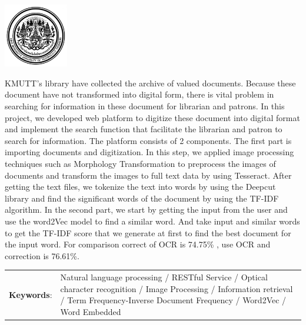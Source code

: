 \documentclass[12pt,oneside,openright,a4paper]{cpe-thai-project}
\begin{document}
\pdfstringdefDisableCommands{%
\let\MakeUppercase\relax
}
\begin{center}
\includegraphics[width=2.8cm]{logo02.jpg}
\end{center}
\vspace*{-1cm}
\maketitlepage
\makesignaturepage 

\abstract

KMUTT's library have collected the archive of valued documents. 
Because these document have not transformed into digital form, 
there is vital problem in searching for information in these 
document for librarian and patrons. In this project, we developed 
web platform to digitize these document into digital format 
and implement the search function that facilitate the librarian 
and patron to search for information. The platform consists of 
2 components. The first part is importing documents and 
digitization. In this step, we applied image processing 
techniques such as Morphology Transformation to preprocess
the images of documents and transform the images to full text 
data by using Tesseract. After getting the text files, we tokenize 
the text into words by using the Deepcut library and find the 
significant words of the document by using the TF-IDF algorithm. 
In the second part, we start by getting the input from the user 
and use the word2Vec model to find a similar word. And take 
input and similar words to get the TF-IDF score that we 
generate at first to find the best document for the input word.  
For comparison correct of  OCR is 74.75\% , use OCR and correction is 76.61\%.
\begin{flushleft}
\begin{tabular*}{\textwidth}{@{}lp{}}
\textbf{Keywords}: & Natural language processing / RESTful Service / Optical character recognition / Image Processing / Information retrieval / Term Frequency-Inverse Document Frequency / Word2Vec / Word Embedded 
\end{tabular*}
\end{flushleft}
\endabstract
\end{document}
